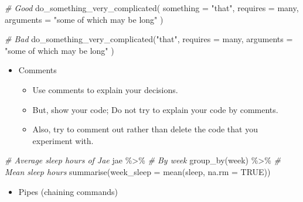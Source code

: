 \documentclass[
]{book}
\newenvironment{Shaded}{\begin{snugshade}}{\end{snugshade}}
\newcommand{\AttributeTok}[1]{\textcolor[rgb]{0.77,0.63,0.00}{#1}}
\newcommand{\CommentTok}[1]{\textcolor[rgb]{0.56,0.35,0.01}{\textit{#1}}}
\newcommand{\ConstantTok}[1]{\textcolor[rgb]{0.00,0.00,0.00}{#1}}
\newcommand{\FunctionTok}[1]{\textcolor[rgb]{0.00,0.00,0.00}{#1}}
\newcommand{\NormalTok}[1]{#1}
\newcommand{\SpecialCharTok}[1]{\textcolor[rgb]{0.00,0.00,0.00}{#1}}
\newcommand{\StringTok}[1]{\textcolor[rgb]{0.31,0.60,0.02}{#1}}
\providecommand{\tightlist}{%
  \setlength{\itemsep}{0pt}\setlength{\parskip}{0pt}}
\begin{document}
\begin{Shaded}
\begin{Highlighting}[]
\CommentTok{\# Good}
\FunctionTok{do\_something\_very\_complicated}\NormalTok{(}
  \AttributeTok{something =} \StringTok{"that"}\NormalTok{,}
  \AttributeTok{requires =}\NormalTok{ many,}
  \AttributeTok{arguments =} \StringTok{"some of which may be long"}
\NormalTok{)}

\CommentTok{\# Bad}
\FunctionTok{do\_something\_very\_complicated}\NormalTok{(}\StringTok{"that"}\NormalTok{, }\AttributeTok{requires =}\NormalTok{ many, }\AttributeTok{arguments =}
                              \StringTok{"some of which may be long"}
\NormalTok{                              )}
\end{Highlighting}
\end{Shaded}

\begin{itemize}
\tightlist
\item
  Comments

  \begin{itemize}
  \tightlist
  \item
    Use comments to explain your decisions.
  \item
    But, show your code; Do not try to explain your code by comments.
  \item
    Also, try to comment out rather than delete the code that you experiment with.
  \end{itemize}
\end{itemize}

\begin{Shaded}
\begin{Highlighting}[]
\CommentTok{\# Average sleep hours of Jae}
\NormalTok{jae }\SpecialCharTok{\%\textgreater{}\%}
  \CommentTok{\# By week}
  \FunctionTok{group\_by}\NormalTok{(week) }\SpecialCharTok{\%\textgreater{}\%}
  \CommentTok{\# Mean sleep hours }
  \FunctionTok{summarise}\NormalTok{(}\AttributeTok{week\_sleep =} \FunctionTok{mean}\NormalTok{(sleep, }\AttributeTok{na.rm =} \ConstantTok{TRUE}\NormalTok{))}
\end{Highlighting}
\end{Shaded}

\begin{itemize}
\tightlist
\item
  Pipes (chaining commands)
\end{itemize}
\end{document}
